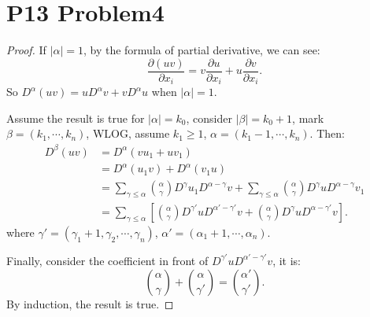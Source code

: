 \documentclass[a4paper]{ctexart}
\newcommand{\pdfFrac}[2]{\frac{\partial #1}{\partial #2}}
\begin{document}
\section*{P13 Problem4}
\begin{proof}
If $|\alpha|=1$, by the formula of partial derivative, we can see:
$$
\pdfFrac{(uv)}{x_{i}}=v\pdfFrac{u}{x_{i}}+u\pdfFrac{v}{x_{i}}.
$$
So $D^{\alpha}(uv)=uD^{\alpha}v+vD^{\alpha}u$ when $|\alpha|=1$.

Assume the result is true for $|\alpha|=k_{0}$, consider $|\beta|=k_{0}+1$, mark 
$\beta=(k_{1},\cdots,k_{n})$, WLOG, assume $k_{1}\ge 1$, $\alpha=(k_{1}-1,\cdots,k_{n})$. Then:
\begin{equation}
    \begin{aligned}
        D^{\beta}(uv)&=D^{\alpha}(vu_{1}+uv_{1})\\
        &=D^{\alpha}(u_{1}v)+D^{\alpha}(v_{1}u)\\
        &=\sum_{\gamma\le\alpha}\binom{\alpha}{\gamma}D^{\gamma}u_{1}D^{\alpha-\gamma}v
        +\sum_{\gamma\le\alpha}\binom{\alpha}{\gamma}D^{\gamma}uD^{\alpha-\gamma}v_{1}\\
        &=\sum_{\gamma\le\alpha}\left[\binom{\alpha}{\gamma}D^{\gamma'}uD^{\alpha'-\gamma'}v
        +\binom{\alpha}{\gamma}D^{\gamma}uD^{\alpha-\gamma'}v\right].
    \end{aligned}
\end{equation}
where $\gamma'=(\gamma_{1}+1,\gamma_{2},\cdots,\gamma_{n})$, $\alpha'=(\alpha_{1}+1,\cdots,\alpha_{n})$.

Finally, consider the coefficient in front of $D^{\gamma'}uD^{\alpha'-\gamma'}v$, it is:
$$
\binom{\alpha}{\gamma}+\binom{\alpha}{\gamma'}=\binom{\alpha'}{\gamma'}.
$$
By induction, the result is true.
\end{proof}
\end{document}
